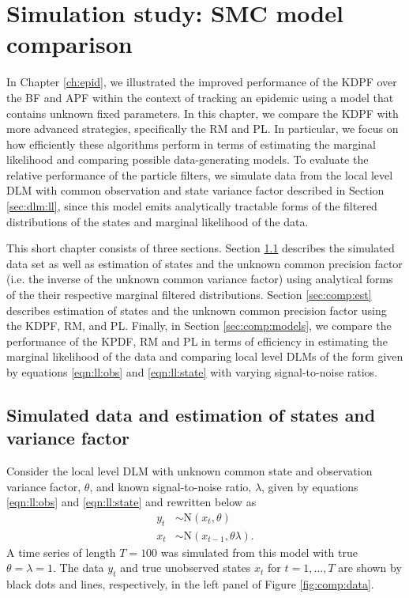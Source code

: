 \chapter{Simulation study: SMC model comparison \label{ch:comp}}

In Chapter \ref{ch:epid}, we illustrated the improved performance of the KDPF over the BF and APF within the context of tracking an epidemic using a model that contains unknown fixed parameters. In this chapter, we compare the KDPF with more advanced strategies, specifically the RM and PL. In particular, we focus on how efficiently these algorithms perform in terms of estimating the marginal likelihood and comparing possible data-generating models. To evaluate the relative performance of the particle filters, we simulate data from the local level DLM with common observation and state variance factor described in Section \ref{sec:dlm:ll}, since this model emits analytically tractable forms of the filtered distributions of the states and marginal likelihood of the data.

This short chapter consists of three sections. Section \ref{sec:comp:data} describes the simulated data set as well as estimation of states and the unknown common precision factor (i.e. the inverse of the unknown common variance factor) using analytical forms of the their respective marginal filtered distributions. Section \ref{sec:comp:est} describes estimation of states and the unknown common precision factor using the KDPF, RM, and PL. Finally, in Section \ref{sec:comp:models}, we compare the performance of the KPDF, RM and PL in terms of efficiency in estimating the marginal likelihood of the data and comparing local level DLMs of the form given by equations \eqref{eqn:ll:obs} and \eqref{eqn:ll:state} with varying signal-to-noise ratios.

\section{Simulated data and estimation of states and variance factor} \label{sec:comp:data}

Consider the local level DLM with unknown common state and observation variance factor, $\theta$, and known signal-to-noise ratio, $\lambda$, given by equations \eqref{eqn:ll:obs} and \eqref{eqn:ll:state} and rewritten below as
\begin{align*}
y_t &\sim \mbox{N}(x_t, \theta) \\
x_t &\sim \mbox{N}(x_{t-1}, \theta\lambda).
\end{align*}
A time series of length $T = 100$ was simulated from this model with true $\theta = \lambda = 1$. The data $y_t$ and true unobserved states $x_t$ for $t=1,\ldots,T$ are shown by black dots and lines, respectively, in the left panel of Figure \ref{fig:comp:data}.

